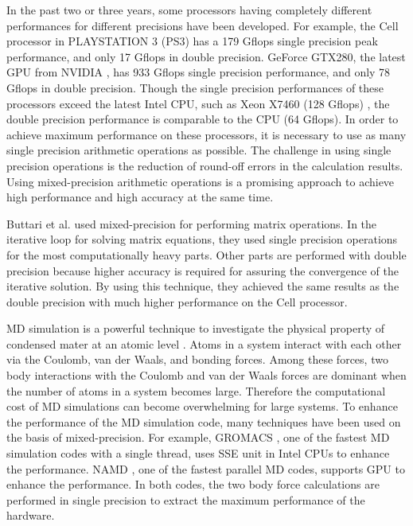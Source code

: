 In the past two or three years, some processors having completely
different performances for different precisions have been developed.
For example, the Cell processor \cite{cell} in PLAYSTATION 3 (PS3)
\cite{PS3} has a 179 Gflops single precision peak performance, and
only 17 Gflops in double precision. GeForce GTX280, the latest GPU
from NVIDIA \cite{NVIDIA}, has 933 Gflops single precision
performance, and only 78 Gflops in double precision. Though the single
precision performances of these processors exceed the latest Intel
CPU, such as Xeon X7460 (128 Gflops) \cite{XeonX7460}, the double
precision performance is comparable to the CPU (64 Gflops).  In order
to achieve maximum performance on these processors, it is necessary to
use as many single precision arithmetic operations as possible.  The
challenge in using single precision operations is the reduction of
round-off errors in the calculation results.  Using mixed-precision
arithmetic operations is a promising approach to achieve high
performance and high accuracy at the same time.

Buttari et al. \cite{Buttari} used mixed-precision for performing
matrix operations.  In the iterative loop for solving matrix
equations, they used single precision operations for the most
computationally heavy parts.  Other parts are performed with double
precision because higher accuracy is required for assuring the
convergence of the iterative solution.  By using this technique, they
achieved the same results as the double precision with much higher
performance on the Cell processor. 

MD simulation is a powerful technique to investigate the physical
property of condensed mater at an atomic level \cite{Karplus}. Atoms
in a system interact with each other via the Coulomb, van der Waals,
and bonding forces. Among these forces, two body interactions with the
Coulomb and van der Waals forces are dominant when the number of atoms
in a system becomes large. Therefore the computational cost of MD
simulations can become overwhelming for large systems.  To enhance the
performance of the MD simulation code, many techniques have been used
on the basis of mixed-precision. For example, GROMACS \cite{GROMACS},
one of the fastest MD simulation codes with a single thread, uses SSE
unit in Intel CPUs to enhance the performance. NAMD \cite{NAMD1,
NAMD2}, one of the fastest parallel MD codes, supports GPU to enhance
the performance. In both codes, the two body force calculations are
performed in single precision to extract the maximum performance of
the hardware.

